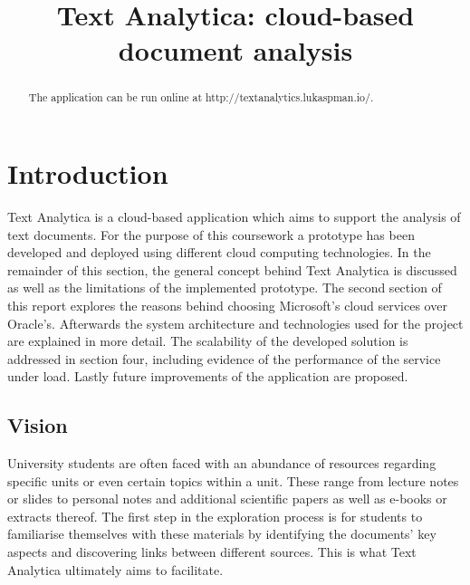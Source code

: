 \documentclass[conference]{IEEEtran}
\begin{document}
\title{Text Analytica: cloud-based document analysis\\}

\author{
\and
{}
}

\maketitle

\begin{abstract}
The application can be run online at http://textanalytics.lukaspman.io/.
\end{abstract}

\section{Introduction}
Text Analytica is a cloud-based application which aims to support the analysis of text documents. For the purpose of this coursework a prototype has been developed and deployed using different cloud computing technologies. In the remainder of this section, the general concept behind Text Analytica is discussed as well as the limitations of the implemented prototype. The second section of this report explores the reasons behind choosing Microsoft’s cloud services over Oracle’s. Afterwards the system architecture and technologies used for the project are explained in more detail. The scalability of the developed solution is addressed in section four, including evidence of the performance of the service under load. Lastly future improvements of the application are proposed.

\subsection{Vision}
University students are often faced with an abundance of resources regarding specific units or even certain topics within a unit. These range from lecture notes or slides to personal notes and additional scientific papers as well as e-books or extracts thereof. The first step in the exploration process is for students to familiarise themselves with these materials by identifying the documents’ key aspects and discovering links between different sources. This is what Text Analytica ultimately aims to facilitate.
\end{document}
